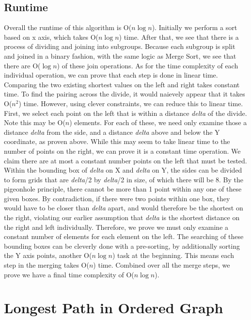 \documentclass[titlepage]{article}
\numberwithin{equation}{subsection}
\begin{document}
\subsection{Runtime}
Overall the runtime of this algorithm is O($n\log n$). Initially we perform a sort based on x axis, which takes
O($n\log n$) time. After that, we see that there is a process of dividing and joining into subgroups. Because 
each subgroup is split and joined in a binary fashion, with the same logic as Merge Sort, we see that there 
are O($\log n$) of these join operations. As for the time complexity of each individual operation, we can prove that
each step is done in linear time. Comparing the two existing shortest values on the left and right takes constant
time. To find the pairing across the divide, it would naievely appear that it takes O($n^{2}$) time. However, using
clever constraints, we can reduce this to linear time. First, we select each point on the left that is within
a distance \textit{delta} of the divide. Note this may be O($n$) elements. For each of these, we need only examine
those a distance \textit{delta} from the side, and a distance \textit{delta} above and below the Y coordinate, as
proven above. While this may seem to take linear time to the number of points on the right, we can prove it is
a constant time operation. We claim there are at most a constant number points on the left that must be tested. 
Within the bounding box of \textit{delta} on X and \textit{delta} on Y, the sides can be divided to form grids
that are \textit{delta}/2 by \textit{delta}/2 in size, of which there will be 8. By the pigeonhole principle,
there cannot be more than 1 point within any one of these given boxes. By contradiction, if there were two points
within one box, they would have to be closer than \textit{delta} apart, and would therefore be the shortest on the
right, violating our earlier assumption that \textit{delta} is the shortest distance on the right and left individually.
Therefore, we prove we must only examine a constant number of elements for each element on the left. The searching
of these bounding boxes can be cleverly done with a pre-sorting, by additionally sorting the Y axis points, another
O($n\log n$) task at the beginning. This means each step in the merging takes O($n$) time. Combined over all the
merge steps, we prove we have a final time complexity of O($n\log n$).
\section{Longest Path in Ordered Graph}
\end{document}
